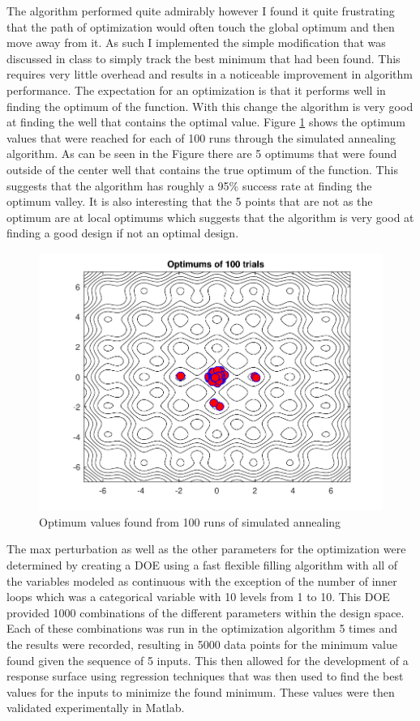\documentclass{article}
\newcommand{\wide}{0.7\linewidth}
\begin{document}
The algorithm performed quite admirably however I found it quite frustrating that the path of optimization would often touch the global optimum and then move away from it.  As such I implemented the simple modification that was discussed in class to simply track the best minimum that had been found.  This requires very little overhead and results in a noticeable improvement in algorithm performance.  The expectation for an optimization is that it performs well in finding the optimum of the function. With this change the algorithm is very good at finding the well that contains the optimal value.  Figure \ref{fig:optimums} shows the optimum values that were reached for each of 100 runs through the simulated annealing algorithm.  As can be seen in the Figure there are 5 optimums that were found outside of the center well that contains the true optimum of the function.  This suggests that the algorithm has roughly a 95\% success rate at finding the optimum valley.  It is also interesting that the 5 points that are not as the optimum are at local optimums which suggests that the algorithm is very good at finding a good design if not an optimal design.
\begin{figure}[h]
	\centering
	\includegraphics[width = \wide]{trialsReport}
	\caption{Optimum values found from 100 runs of simulated annealing}
	\label{fig:optimums}
\end{figure}

The max perturbation as well as the other parameters for the optimization were determined by creating a DOE using a fast flexible filling algorithm with all of the variables modeled as continuous with the exception of the number of inner loops which was a categorical variable with 10 levels from 1 to 10.  This DOE provided 1000 combinations of the different parameters within the design space. Each of these combinations was run in the optimization algorithm 5 times and the results were recorded, resulting in 5000 data points for the minimum value found given the sequence of 5 inputs.  This then allowed for the development of a response surface using regression techniques that was then used to find the best values for the inputs to minimize the found minimum. These values were then validated experimentally in Matlab.
\end{document}

